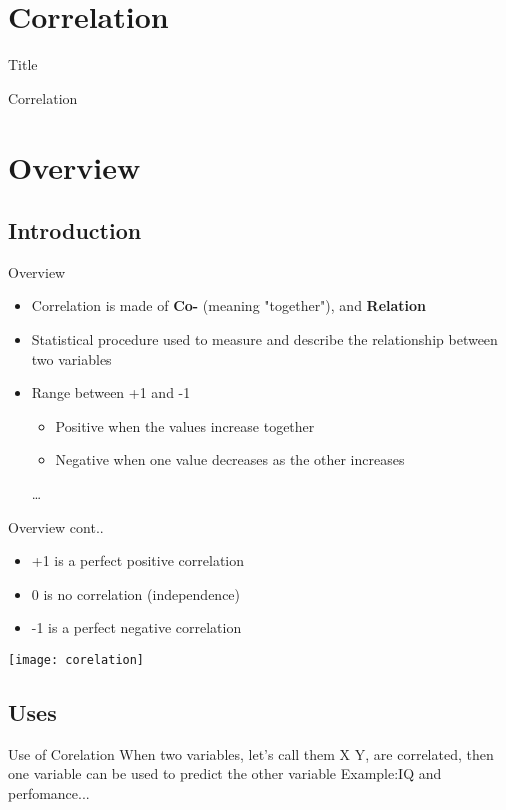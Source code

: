 \documentclass[slidestop,compress,14pt,xcolor=dvipsnames]{beamer}
\author{Ken Mwai}
\institute{Pwani-University R WorkShop}
\begin{document}

\section{Correlation}
\begin{frame}{Title}
\vspace*{\fill}
\begin{center}
Correlation
\end{center}
\vspace*{\fill}
\end{frame}

\section{Overview}
\subsection{Introduction}
\begin{frame}{Overview}
\begin{itemize}
    \item  Correlation is made of {\bf Co- } (meaning "together"), and {\bf Relation }
    \item Statistical procedure used to measure and describe the relationship between two variables 
    \item Range between +1 and -1
      \begin{itemize}
        \item Positive when the values increase together
        \item Negative when one value decreases as the other increases 
      \end{itemize}
\ldots
\end{itemize}
\end{frame}
\begin{frame}{Overview cont..}
\begin{itemize}
  \item +1 is a perfect positive correlation
  \item 0 is no correlation (independence)
  \item -1 is a perfect negative correlation
\end{itemize}
\texttt{[image: corelation]}
\end{frame}
\subsection{Uses}
\begin{frame}{Use of Corelation}
When two variables, let's call them X  Y, are correlated, then one variable can be
used to predict the other variable \newline
Example:IQ and perfomance...

\end{frame}
\end{document}
